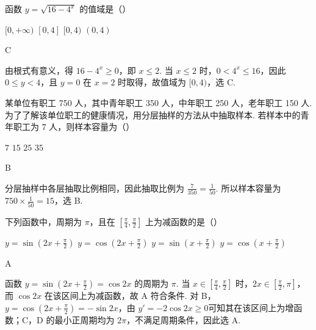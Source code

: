 \begin{problem}
函数 \( y = \sqrt{16 - 4^x} \) 的值域是（\quad）

\choices
    {\([0, +\infty)\)}
    {\([0,4]\)}
    {\([0,4)\)}
    {\((0,4)\)}
\end{problem}

\begin{answer}
C
\end{answer}

\begin{solution}
由根式有意义，得 \(16-4^{x}\geq0\)，即 \(x\leq2\). 当 \(x\leq2\) 时，\(0<4^{x}\leq16\)，因此 \(0\leq y<4\)，且 \(y=0\) 在 \(x=2\) 时取得，故值域为 \([0,4)\)，选 C.
\end{solution}

\begin{problem}
某单位有职工 750 人，其中青年职工 350 人，中年职工 250 人，老年职工 150 人. 为了了解该单位职工的健康情况，用分层抽样的方法从中抽取样本. 若样本中的青年职工为 \(7\) 人，则样本容量为（\quad）

\choices
    {\(7\)}
    {\(15\)}
    {\(25\)}
    {\(35\)}
\end{problem}

\begin{answer}
B
\end{answer}

\begin{solution}
分层抽样中各层抽取比例相同，因此抽取比例为 \(\frac{7}{350}=\frac{1}{50}\). 所以样本容量为 \(750\times\frac{1}{50}=15\)，选 B.
\end{solution}

\begin{problem}
下列函数中，周期为 \(\pi\)，且在 \(\left[\frac{\pi}{4}, \frac{\pi}{2}\right]\) 上为减函数的是（\quad）

\choices
    {\( y = \sin \left(2x + \frac{\pi}{2}\right) \)}
    {\( y = \cos \left(2x + \frac{\pi}{2}\right) \)}
    {\( y = \sin \left(x + \frac{\pi}{2}\right) \)}
    {\( y = \cos \left(x + \frac{\pi}{2}\right) \)}
\end{problem}

\begin{answer}
A
\end{answer}

\begin{solution}
函数 \(y=\sin\left(2x+\frac{\pi}{2}\right)=\cos2x\) 的周期为 \(\pi\). 当 \(x\in\left[\frac{\pi}{4},\frac{\pi}{2}\right]\) 时，\(2x\in\left[\frac{\pi}{2},\pi\right]\)，而 \(\cos2x\) 在该区间上为减函数，故 A 符合条件. 对 B，\(y=\cos\left(2x+\frac{\pi}{2}\right)=-\sin2x\)，由 \(y'=-2\cos2x\geqslant0\)可知其在该区间上为增函数；C，D 的最小正周期均为 \(2\pi\)，不满足周期条件，因此选 A.
\end{solution}

